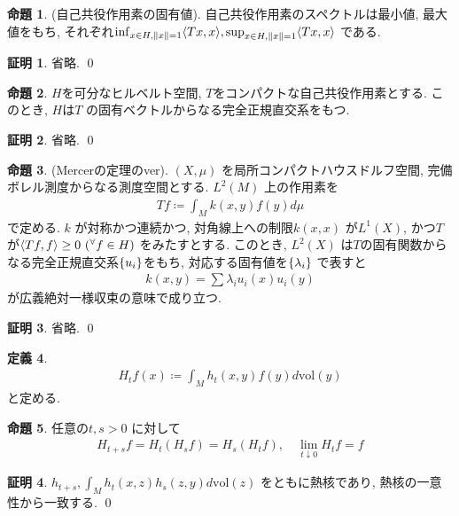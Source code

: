 \documentclass[twocolumn, landscape, a4paper , 8pt, fleqn, titlepage ]{jsarticle}
\theoremstyle{definition}
\newtheorem{dfn}{定義}[section]
\newtheorem{prop}[dfn]{命題}
\newtheorem*{pf*}{証明}
\newcommand{\any}{{}^{\forall}}
\newcommand{\cbra}[1]{\mleft\{#1\mright\}}
\newcommand{\tbra}[1]{\mleft\langle#1\mright\rangle}
\newcommand{\norm}[1]{\left\|#1\right\|}
\newcommand{\vol}{\textrm{vol}}
\renewcommand{\-}{\hyphen}
\begin{document}
\begin{prop}(自己共役作用素の固有値).
自己共役作用素のスペクトルは最小値, 最大値をもち, それぞれ$\inf_{x \in H, \norm x = 1} \tbra{Tx, x}, \sup_{x \in H, \norm x = 1} \tbra{Tx, x}$ である.
\end{prop}
\begin{pf*}
省略.
\qed
\end{pf*}


\begin{prop}
$H$を可分なヒルベルト空間, $T$をコンパクトな自己共役作用素とする. このとき, $H$は$T$ の固有ベクトルからなる完全正規直交系をもつ. 
\end{prop}
\begin{pf*}
省略.
\qed
\end{pf*}

\begin{prop}(Mercerの定理のver). $(X,\mu)$ を局所コンパクトハウスドルフ空間, 完備ボレル測度からなる測度空間とする. $L^2(M)$ 上の作用素を
\begin{align*} Tf \coloneqq \int_M k(x,y) f(y) d \mu  \end{align*}
で定める. $k$ が対称かつ連続かつ, 対角線上への制限$k(x,x)$ が$L^1(X)$, かつ$T$が$\tbra{Tf, f} \geq 0 \,\, (\any f \in H)$ をみたすとする. このとき, $L^2(X)$ は$T$の固有関数からなる完全正規直交系$\cbra{u_i}$をもち, 対応する固有値を$\cbra{\lambda _i}$ で表すと
\begin{align*} k(x,y) = \sum \lambda_i u_i(x) u_i (y) \end{align*}
が広義絶対一様収束の意味で成り立つ.
\end{prop}
\begin{pf*}
省略.
\qed
\end{pf*}


\begin{dfn}
\begin{align*} H_t f (x) \coloneqq \int_M h_t(x,y)f(y) d \vol(y) \end{align*}
と定める.
\end{dfn}

\begin{prop}任意の$t,s >0$ に対して
\begin{align*} H_{t+s}f = H_t(H_s f) = H_s(H_t f), \quad \lim_{t \downarrow 0}H_{t}f = f \end{align*}
\end{prop}
\begin{pf*}
$h_{t+s}, \int_M h_t(x,z)h_s(z,y) d \vol(z) $ をともに熱核であり, 熱核の一意性から一致する. 
\qed
\end{pf*}
\end{document}
